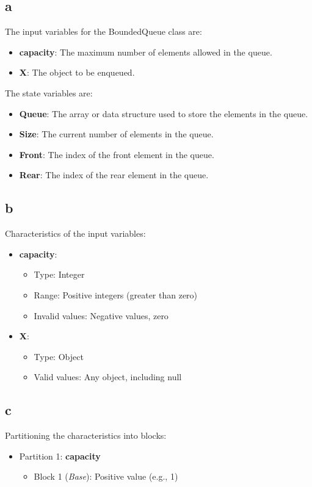 \documentclass{article}
\begin{document}
\begin{latin}
\subsection{a}
The input variables for the BoundedQueue class are:
\begin{itemize}
\item \textbf{capacity}: The maximum number of elements allowed in the queue.
\item \textbf{X}: The object to be enqueued.
\end{itemize}
The state variables are:
\begin{itemize}
    \item \textbf{Queue}: The array or data structure used to store the elements in the queue.
    \item \textbf{Size}: The current number of elements in the queue.
    \item \textbf{Front}: The index of the front element in the queue.
    \item \textbf{Rear}: The index of the rear element in the queue.
\end{itemize}

\subsection{b}
Characteristics of the input variables:
\begin{itemize}
    \item \textbf{capacity}:
    \begin{itemize}
        \item Type: Integer
        \item Range: Positive integers (greater than zero)
        \item Invalid values: Negative values, zero
    \end{itemize}
    
    \item \textbf{X}:
    \begin{itemize}
        \item Type: Object
        \item Valid values: Any object, including null
    \end{itemize}
\end{itemize}

\subsection{c}
Partitioning the characteristics into blocks:
\begin{itemize}
    \item Partition 1: \textbf{capacity}
    \begin{itemize}
        \item Block 1 (\textit{Base}): Positive value (e.g., 1)
    \end{itemize}
    

\end{itemize}
\end{latin}
\end{document}
